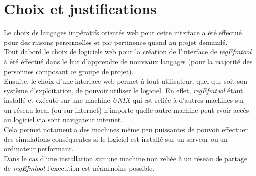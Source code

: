 \chapter{Choix et justifications}
Le choix de langages impératifs orientés web pour cette interface a été effectué pour des raisons personnelles et par pertinence quand au projet demandé.\\
Tout dabord le choix de logiciels web pour la création de l'interface de \emph{regEfmtool} à été éffectué dans le but d'apprendre de nouveaux langages (pour la majorité des personnes composant ce groupe de projet).\\
Ensuite, le choix d'une interface web permet à tout utilisateur, quel que soit son système d'exploitation, de pouvoir utiliser le logiciel. En effet, \emph{regEfmtool} 
étant installé et exécuté sur une machine \emph{UNIX} qui est reliée à d'autres machines sur un réseau local (ou sur internet) 
n'importe quelle autre machine peut avoir accès au logiciel via sont navigateur internet.\\
Cela permet notament a des machines même peu puissantes de pouvoir effectuer des simulations conséquentes si le logiciel est installé sur un serveur ou un ordinateur performant.\\
Dans le cas d'une installation sur une machine non reliée à un réseau de partage de \emph{regEfmtool} l'execution est néammoins possible.
